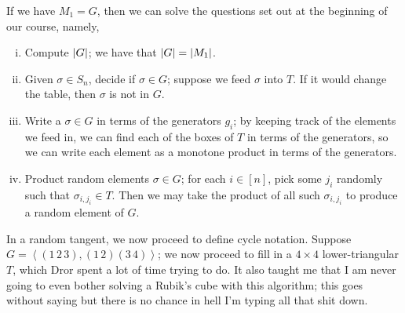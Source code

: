\noindent If we have $M_1 = G$, then we can solve the questions set out at the beginning of our course, namely,
\begin{enumerate}[(i)]
    \item Compute $\left\lvert G \right\rvert$; we have that $\left\lvert G \right\rvert = \left\lvert M_1 \right\rvert$.
    \item Given $\sigma \in S_n$, decide if $\sigma \in G$; suppose we feed $\sigma$ into $T$. If it would change the table, then $\sigma$ is not in $G$.
    \item Write a $\sigma \in G$ in terms of the generators $g_i$; by keeping track of the elements we feed in, we can find each of the boxes of $T$ in terms of the generators, so we can write each element as a monotone product in terms of the generators.
    \item Product random elements $\sigma \in G$; for each $i \in [n]$, pick some $j_i$ randomly such that $\sigma_{i, j_i} \in T$. Then we may take the product of all such $\sigma_{i, j_i}$ to produce a random element of $G$.
\end{enumerate}
In a random tangent, we now proceed to define cycle notation. Suppose $G = \left<(1 \, 2 \, 3), (1 \, 2) (3 \, 4)\right>$; we now proceed to fill in a $4 \times 4$ lower-triangular $T$, which Dror spent a lot of time trying to do. It also taught me that I am never going to even bother solving a Rubik's cube with this algorithm; this goes without saying but there is no chance in hell I'm typing all that shit down.